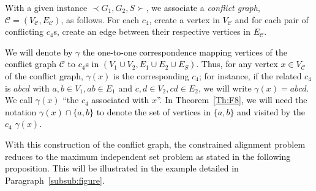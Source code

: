 \documentclass[final]{dmtcs-episciences}
\newcommand\mar[1]{\textcolor{black}{#1}}
\begin{document}
\mar{With} a given instance $\prec G_1,G_2,S \succ$, we \mar{associate} a  \emph{ conflict graph}, \mar{$\mathcal{C}=\left(V_{\mathcal{C}}, E_{\mathcal{C}}\right)$}, as follows. 
 For each $c_4$, create a vertex in \mar{$V_{\mathcal{C}}$} and for each pair of conflicting $c_4$s, create an edge between their respective vertices in \mar{$E_{\mathcal{C}}$}. 


\mar{We will denote by $\gamma$ the one-to-one correspondence mapping vertices of the conflict graph $\mathcal{C}$ to $c_4$s in $(V_1\cup V_2, E_1\cup E_2\cup E_S)$.
Thus, 
for any vertex $x\in V_{\mathcal{C}}$ of the conflict graph, $\gamma(x)$ is} the corresponding $c_4$; for instance, if the related $c_4$ is $abcd$ with $a,b \in V_1, ab\in E_1$ and $c,d\in V_2, cd\in E_2$, we will write $\gamma(x)=abcd$. We 
call $\gamma(x)$ ``the $c_4$ \mar{associated with} $x$''. \mar{In Theorem~\ref{Th:F8}, we will need the notation $\gamma(x)\cap \{a,b\}$ to denote the set of vertices in $\{a,b\}$ and visited by the $c_4$ $\gamma(x)$.}  





With this construction of the conflict graph, the constrained alignment problem  reduces to the maximum independent set problem \mar{as stated in the following proposition. This will be illustrated in the example detailed in Paragraph~\ref{subsub:figure}.}
\end{document}
